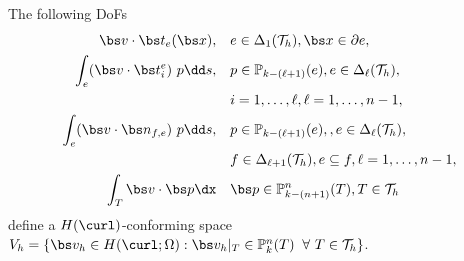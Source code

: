 \begin{lemma}\label{lm:nedelec}
The following {\rm DoFs}
\begin{align}
\label{eq:vecbdDoF0Th}
\bs v\cdot \bs t_{e}({\bs x}), & \quad e\in \Delta_{1}(\mathcal T_h), {\bs x}\in \partial e, \\
\label{eq:vecbdDoF1Th}
\int_e (\bs v\cdot \bs t_i^e)\ p \dd s, &\quad  p\in \mathbb P_{k - (\ell +1)} (e), e\in \Delta_{\ell}(\mathcal T_h),\\
& \quad  i=1,\ldots, \ell, \ell = 1,\ldots, n-1, \notag\\
\label{eq:vecbdDoF2Th}
\int_e (\bs v\cdot \bs n_{f,e})\ p \dd s, &\quad  p\in \mathbb P_{k - (\ell +1)} (e), , e\in \Delta_{\ell}(\mathcal T_h), \\
& \quad f\in \Delta_{\ell+1}(\mathcal T_h), e\subseteq f, \ell = 1,\ldots, n-1, \notag\\
\int_T \bs v \cdot \bs p \dx&\quad \bs p\in \mathbb P_{k-(n+1)}^n(T), T\in \mathcal T_h \label{eq:bubbleDoFTh}
\end{align}
define a $H(\curl)$-conforming space $V_h=\{\bs v_h\in H(\curl; \Omega): \bs v_h|_T\in\mathbb P_k^n(T) \;\; \forall~T\in\mathcal T_h\}$.
\end{lemma}
